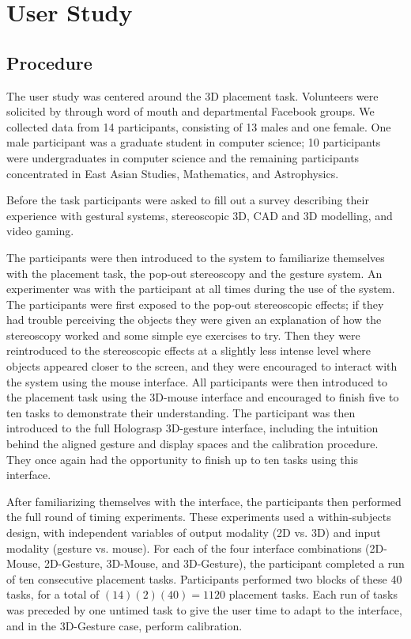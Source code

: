 \documentclass[pageno]{jpaper}
\begin{document}
\section{User Study}
\subsection{Procedure}
The user study was centered around the 3D placement task. Volunteers were solicited by
through word of mouth and departmental Facebook groups. We collected data from 14 participants,
consisting of 13 males and one female. One male participant was a graduate student in computer
science; 10 participants were undergraduates in computer science and the remaining participants
concentrated in East Asian Studies, Mathematics, and Astrophysics.

Before the task participants were asked to fill out a survey describing their experience with
gestural systems, stereoscopic 3D, CAD and 3D modelling, and video gaming.

The participants were then introduced to the system to familiarize themselves with the placement task, the pop-out
stereoscopy and the gesture system. An experimenter was with the participant at all times during
the use of the system. The participants were first exposed to the pop-out stereoscopic effects;
if they had trouble perceiving the objects they were given an explanation of how the stereoscopy
worked and some simple eye exercises to try. Then they were reintroduced to the stereoscopic effects
at a slightly less intense level where objects appeared closer to the screen, and they were encouraged
to interact with the system using the mouse interface. All participants were then introduced to the placement
task using the 3D-mouse interface and encouraged to finish five to ten tasks to demonstrate their understanding.
The participant was then introduced to the full Holograsp 3D-gesture interface, including the intuition behind the aligned gesture and display
spaces and the calibration procedure. They once again had the opportunity to finish up to ten tasks using this interface.

After familiarizing themselves with the interface, the participants then performed the full round of timing experiments. These
experiments used a within-subjects design, with independent variables of output modality (2D vs. 3D) and input modality (gesture vs. mouse).
For each of the four interface combinations (2D-Mouse, 2D-Gesture, 3D-Mouse, and 3D-Gesture), the participant completed a
run of ten consecutive placement tasks. Participants performed two blocks of these 40 tasks, for a total of $(14)(2)(40) = 1120$
placement tasks. Each run of tasks was preceded by one untimed task to give the user time to adapt to the interface, and
in the 3D-Gesture case, perform calibration.
\end{document}
